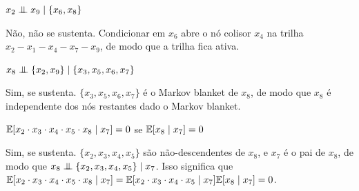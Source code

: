 \begin{exenumerate}
    
    \item $x_2 \mathrel{\perp\mspace{-10mu}\perp} x_9 \mid \{x_6, x_8\}$ 
    
    \begin{solution}
        N\~ao, n\~ao se sustenta. Condicionar em $x_6$ abre o n\'o colisor $x_4$ na trilha $x_2 - x_1 - x_4 - x_7 - x_9$, de modo que a trilha fica ativa.
    \end{solution}
    
    
    \item $x_8 \mathrel{\perp\mspace{-10mu}\perp} \{x_2,x_9\} \mid \{x_3,x_5, x_6, x_7\}$ 
    
    \begin{solution}
        Sim, se sustenta. $\{x_3,x_5,x_6,x_7\}$ \'e o Markov blanket de $x_8$, de modo que $x_8$ \'e independente dos n\'os restantes dado o Markov blanket.
    \end{solution}
    
    
    \item $\mathbb{E}[ x_2 \cdot x_3 \cdot x_4 \cdot x_5 \cdot x_8 \mid x_7] = 0$ se $\mathbb{E}[x_8 \mid x_7] = 0$
    
    \begin{solution}
        Sim, se sustenta. $\{x_2,x_3,x_4,x_5\}$ s\~ao n\~ao-descendentes de $x_8$, e $x_7$ \'e o pai de $x_8$, de modo que $x_8 \mathrel{\perp\mspace{-10mu}\perp} \{x_2,x_3,x_4,x_5\} \mid x_7$. Isso significa que $\mathbb{E}[ x_2 \cdot x_3 \cdot x_4 \cdot x_5 \cdot x_8 \mid x_7] = \mathbb{E}[ x_2 \cdot x_3 \cdot x_4 \cdot x_5 \mid x_7] \mathbb{E}[x_8 \mid x_7] =0$.
    \end{solution}
    
    
\end{exenumerate}


